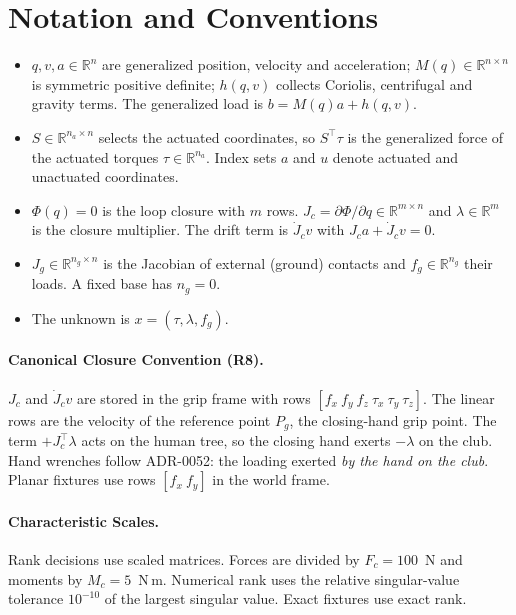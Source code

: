 \documentclass[11pt,a4paper]{article}
\newcommand{\R}{\mathbb{R}}
\begin{document}
\section{Notation and Conventions}
\label{sec:notation}

\begin{itemize}[leftmargin=*]
\item $q,v,a\in\R^n$ are generalized position, velocity and acceleration;
$M(q)\in\R^{n\times n}$ is symmetric positive definite; $h(q,v)$ collects
Coriolis, centrifugal and gravity terms.  The generalized load is
$b=M(q)a+h(q,v)$.
\item $S\in\R^{n_a\times n}$ selects the actuated coordinates, so $S^{\top}\tau$
is the generalized force of the actuated torques $\tau\in\R^{n_a}$.  Index sets
$a$ and $u$ denote actuated and unactuated coordinates.
\item $\Phi(q)=0$ is the loop closure with $m$ rows.  $J_c=\partial\Phi/\partial
q\in\R^{m\times n}$ and $\lambda\in\R^m$ is the closure multiplier.  The drift
term is $\dot J_c v$ with $J_c a+\dot J_c v=0$.
\item $J_g\in\R^{n_g\times n}$ is the Jacobian of external (ground) contacts and
$f_g\in\R^{n_g}$ their loads.  A fixed base has $n_g=0$.
\item The unknown is $x=(\tau,\lambda,f_g)$.
\end{itemize}

\paragraph{Canonical Closure Convention (R8).}
$J_c$ and $\dot J_c v$ are stored in the grip frame with rows
$[f_x\ f_y\ f_z\ \tau_x\ \tau_y\ \tau_z]$.  The linear rows are the velocity of
the reference point $P_g$, the closing-hand grip point.  The term $+J_c^{\top}
\lambda$ acts on the human tree, so the closing hand exerts $-\lambda$ on the
club.  Hand wrenches follow ADR-0052: the loading exerted \emph{by the hand on
the club}.  Planar fixtures use rows $[f_x\ f_y]$ in the world frame.

\paragraph{Characteristic Scales.}
Rank decisions use scaled matrices.  Forces are divided by $F_c=100$~N and
moments by $M_c=5$~N\,m.  Numerical rank uses the relative singular-value
tolerance $10^{-10}$ of the largest singular value.  Exact fixtures use exact
rank.
\end{document}
